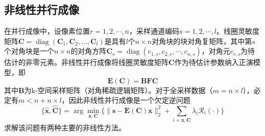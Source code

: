 \documentclass[12pt]{article}
\begin{document}
\subsection{非线性并行成像}
在并行成像中，设像素位置$r=1,2,\cdots,n$，采样通道编码$s=1,2,\cdots,l$。线圈灵敏度矩阵$\mathbf{C}=\operatorname{diag}(\mathbf{C}_1,\mathbf{C}_2,\ldots,\mathbf{C}_l)$是具有$l$个$n\times n$对角块的块对角复矩阵，其中第$s$个对角块是一个$n\times n$的对角方阵$\mathbf{C}_s=\operatorname{diag}(c_{1,s},c_{2,s},\cdots,c_{n,s})$，对角元$c_{r,s}$为待估计的非零元素。非线性并行成像将线圈灵敏度矩阵$\mathbf{C}$作为待估计参数纳入正演模型，即
\begin{equation}
    \mathbf{E}(\mathbf{C})=\mathbf{B}\mathbf{F}\mathbf{C}
\end{equation}
其中$\mathbf{B}$为k-空间采样矩阵（对角稀疏逻辑矩阵）。对于全采样数据（$m=n\times l$），必定有$m<n+n\times l$，因此非线性并行成像是一个欠定逆问题
\begin{equation}
    \{\hat{\bm{x}},\hat{\mathbf{C}}\}=\arg\min_{\bm{x},\mathbf{C}}\{\|\bm{s}-\mathbf{E}(\mathbf{C})\bm{x}\|_2^2+\sum_{i=\bm{x},\mathbf{C}} \lambda_i\mathcal{R}_i(\cdot)\}
    \label{equ:2.40}
\end{equation}
求解该问题有两种主要的非线性方法。
\end{document}
